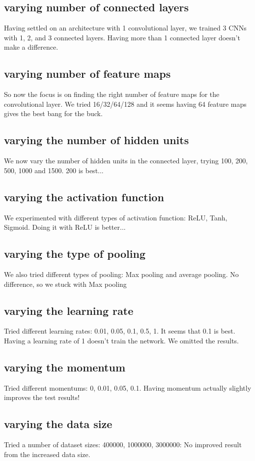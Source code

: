 \subsection{varying number of connected layers}

Having settled on an architecture with 1 convolutional layer, we trained 3 CNNs with 1, 2, and 3 connected layers. Having more than 1 connected layer doesn't make a difference.

\subsection{varying number of feature maps}

So now the focus is on finding the right number of feature maps for the convolutional layer. We tried 16/32/64/128 and it seems having 64 feature maps gives the best bang for the buck.

\subsection{varying the number of hidden units}

We now vary the number of hidden units in the connected layer, trying 100, 200, 500, 1000 and 1500. 200 is best...

\subsection{varying the activation function}

We experimented with different types of activation function: ReLU, Tanh, Sigmoid. Doing it with ReLU is better...

\subsection{varying the type of pooling}

We also tried different types of pooling: Max pooling and average pooling. No difference, so we stuck with Max pooling

\subsection{varying the learning rate}

Tried different learning rates: 0.01, 0.05, 0.1, 0.5, 1. It seems that 0.1 is best. Having a learning rate of 1 doesn't train the network.  We omitted the results.

\subsection{varying the momentum}

Tried different momentums: 0, 0.01, 0.05, 0.1. Having momentum actually slightly improves the test results!

\subsection{varying the data size}

Tried a number of dataset sizes: 400000, 1000000, 3000000: No improved result from the increased data size.


